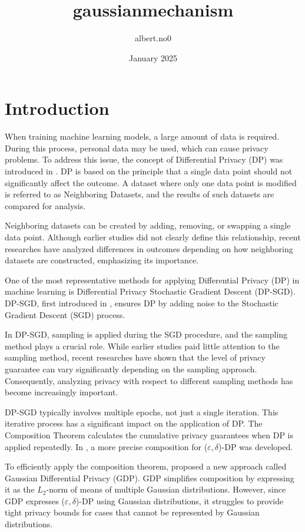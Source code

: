 \documentclass{article}
\title{gaussianmechanism}
\author{albert.no0 }
\date{January 2025}
\begin{document}
\maketitle

\section{Introduction}
When training machine learning models, a large amount of data is required. During this process, personal data may be used, which can cause privacy problems. To address this issue, the concept of Differential Privacy (DP) was introduced in \cite{dwork2006}. DP is based on the principle that a single data point should not significantly affect the outcome. A dataset where only one data point is modified is referred to as Neighboring Datasets, and the results of such datasets are compared for analysis.

Neighboring datasets can be created by adding, removing, or swapping a single data point. Although earlier studies did not clearly define this relationship, recent researches \cite{chua2024private,lebeda2024avoiding} have analyzed differences in outcomes depending on how neighboring datasets are constructed, emphasizing its importance.

One of the most representative methods for applying Differential Privacy (DP) in machine learning is Differential Privacy Stochastic Gradient Descent (DP-SGD). DP-SGD, first introduced in \cite{abadi2016deep}, ensures DP by adding noise to the Stochastic Gradient Descent (SGD) process.

In DP-SGD, sampling is applied during the SGD procedure, and the sampling method plays a crucial role. While earlier studies paid little attention to the sampling method, recent researches have shown that the level of privacy guarantee can vary significantly depending on the sampling approach\cite{chua2024private,lebeda2024avoiding}. Consequently, analyzing privacy with respect to different sampling methods has become increasingly important.

DP-SGD typically involves multiple epochs, not just a single iteration. This iterative process has a significant impact on the application of DP. The Composition Theorem calculates the cumulative privacy guarantees when DP is applied repeatedly. In \cite{kairouz2015composition}, a more precise composition for ($\varepsilon,\delta$)-DP was developed.

To efficiently apply the composition theorem, \cite{dong2022gaussian} proposed a new approach called Gaussian Differential Privacy (GDP). GDP simplifies composition by expressing it as the $L_2$-norm of  means of multiple Gaussian distributions. However, since GDP expresses ($\varepsilon,\delta$)-DP using Gaussian distributions, it struggles to provide tight privacy bounds for cases that cannot be represented by Gaussian distributions.
\end{document}
